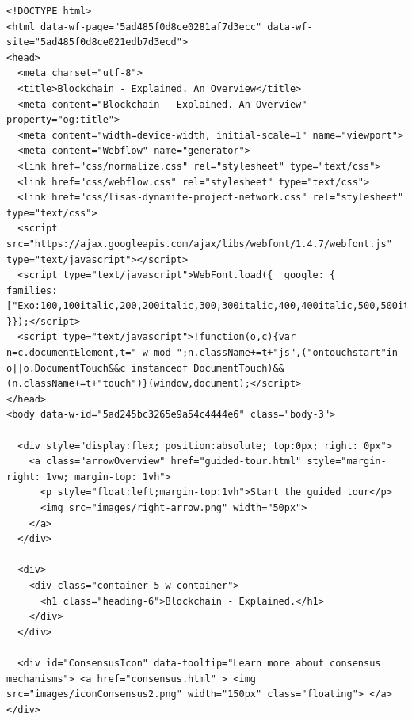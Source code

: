 
\begin{lstlisting}
<!DOCTYPE html>
<html data-wf-page="5ad485f0d8ce0281af7d3ecc" data-wf-site="5ad485f0d8ce021edb7d3ecd">
<head>
  <meta charset="utf-8">
  <title>Blockchain - Explained. An Overview</title>
  <meta content="Blockchain - Explained. An Overview" property="og:title">
  <meta content="width=device-width, initial-scale=1" name="viewport">
  <meta content="Webflow" name="generator">
  <link href="css/normalize.css" rel="stylesheet" type="text/css">
  <link href="css/webflow.css" rel="stylesheet" type="text/css">
  <link href="css/lisas-dynamite-project-network.css" rel="stylesheet" type="text/css">
  <script src="https://ajax.googleapis.com/ajax/libs/webfont/1.4.7/webfont.js" type="text/javascript"></script>
  <script type="text/javascript">WebFont.load({  google: {    families: ["Exo:100,100italic,200,200italic,300,300italic,400,400italic,500,500italic,600,600italic,700,700italic,800,800italic,900,900italic","Roboto:100,100italic,300,300italic,regular,italic,500,500italic,700,700italic,900,900italic"]  }});</script>
  <script type="text/javascript">!function(o,c){var n=c.documentElement,t=" w-mod-";n.className+=t+"js",("ontouchstart"in o||o.DocumentTouch&&c instanceof DocumentTouch)&&(n.className+=t+"touch")}(window,document);</script>
</head>
<body data-w-id="5ad245bc3265e9a54c4444e6" class="body-3">

  <div style="display:flex; position:absolute; top:0px; right: 0px">
    <a class="arrowOverview" href="guided-tour.html" style="margin-right: 1vw; margin-top: 1vh">
      <p style="float:left;margin-top:1vh">Start the guided tour</p>
      <img src="images/right-arrow.png" width="50px">
    </a>
  </div>

  <div>
    <div class="container-5 w-container">
      <h1 class="heading-6">Blockchain - Explained.</h1>
    </div>
  </div>

  <div id="ConsensusIcon" data-tooltip="Learn more about consensus mechanisms"> <a href="consensus.html" > <img src="images/iconConsensus2.png" width="150px" class="floating"> </a></div>


\end{lstlisting}
